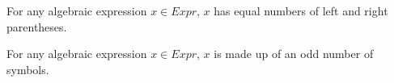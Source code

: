 \begin{thm2}
For any algebraic expression $x \in Expr$, $x$ has equal numbers of left and right parentheses.
\end{thm2}

\begin{thm2}
For any algebraic expression $x \in Expr$, $x$ is made up of an odd number of symbols.
\end{thm2}

